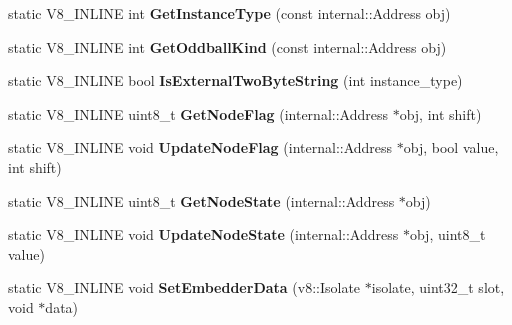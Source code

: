 \begin{DoxyCompactItemize}
\item 
\mbox{\label{classv8_1_1internal_1_1Internals_a1e72cafe72b211a830d4043fa6cb292a}} 
static V8\+\_\+\+I\+N\+L\+I\+NE int {\bfseries Get\+Instance\+Type} (const internal\+::\+Address obj)
\item 
\mbox{\label{classv8_1_1internal_1_1Internals_a1da181e205151dc45bc2de1f6c0a1713}} 
static V8\+\_\+\+I\+N\+L\+I\+NE int {\bfseries Get\+Oddball\+Kind} (const internal\+::\+Address obj)
\item 
\mbox{\label{classv8_1_1internal_1_1Internals_afbf930e9dfde745b54e1e7e03b5b96c8}} 
static V8\+\_\+\+I\+N\+L\+I\+NE bool {\bfseries Is\+External\+Two\+Byte\+String} (int instance\+\_\+type)
\item 
\mbox{\label{classv8_1_1internal_1_1Internals_aaa625b4cc76cec519a9a4bd8973015d3}} 
static V8\+\_\+\+I\+N\+L\+I\+NE uint8\+\_\+t {\bfseries Get\+Node\+Flag} (internal\+::\+Address $\ast$obj, int shift)
\item 
\mbox{\label{classv8_1_1internal_1_1Internals_a7bceedc6da1b004ef3e689b8c50b77d9}} 
static V8\+\_\+\+I\+N\+L\+I\+NE void {\bfseries Update\+Node\+Flag} (internal\+::\+Address $\ast$obj, bool value, int shift)
\item 
\mbox{\label{classv8_1_1internal_1_1Internals_af747dfbe0a82350ba86abde1756631e1}} 
static V8\+\_\+\+I\+N\+L\+I\+NE uint8\+\_\+t {\bfseries Get\+Node\+State} (internal\+::\+Address $\ast$obj)
\item 
\mbox{\label{classv8_1_1internal_1_1Internals_a50f41039e924a59c269d1340ce1da6b3}} 
static V8\+\_\+\+I\+N\+L\+I\+NE void {\bfseries Update\+Node\+State} (internal\+::\+Address $\ast$obj, uint8\+\_\+t value)
\item 
\mbox{\label{classv8_1_1internal_1_1Internals_abe73d79832edf012f30a94ccc4b293d2}} 
static V8\+\_\+\+I\+N\+L\+I\+NE void {\bfseries Set\+Embedder\+Data} (v8\+::\+Isolate $\ast$isolate, uint32\+\_\+t slot, void $\ast$data)

\end{DoxyCompactItemize}
